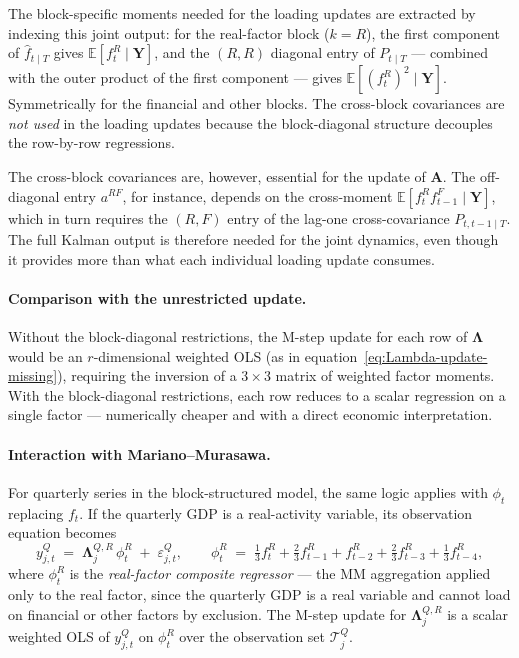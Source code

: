 \documentclass[11pt, a4paper, oneside]{article}
\newcommand{\mL}{\boldsymbol{\Lambda}}
\begin{document}
The block-specific moments needed for the loading updates are
extracted by indexing this joint output: for the real-factor block
($k = R$), the first component of $\hat{f}_{t \mid T}$ gives
$\mathbb{E}[f^R_t \mid \mathbf{Y}]$, and the $(R, R)$ diagonal entry
of $P_{t \mid T}$ — combined with the outer product of the first
component — gives $\mathbb{E}[(f^R_t)^2 \mid \mathbf{Y}]$. Symmetrically
for the financial and other blocks. The cross-block covariances are
\emph{not used} in the loading updates because the block-diagonal
structure decouples the row-by-row regressions.

The cross-block covariances are, however, essential for the update
of $\mathbf{A}$. The off-diagonal entry $a^{RF}$, for instance,
depends on the cross-moment $\mathbb{E}[f^R_t f^F_{t-1} \mid \mathbf{Y}]$,
which in turn requires the $(R, F)$ entry of the lag-one cross-covariance
$P_{t, t-1 \mid T}$. The full Kalman output is therefore needed for
the joint dynamics, even though it provides more than what each
individual loading update consumes.

\paragraph{Comparison with the unrestricted update.}
Without the block-diagonal restrictions, the M-step update for each
row of $\mL$ would be an $r$-dimensional weighted OLS
(as in equation~\eqref{eq:Lambda-update-missing}), requiring the
inversion of a $3 \times 3$ matrix of weighted factor moments. With
the block-diagonal restrictions, each row reduces to a scalar
regression on a single factor — numerically cheaper and with a
direct economic interpretation.

\paragraph{Interaction with Mariano–Murasawa.}
For quarterly series in the block-structured model, the same logic
applies with $\phi_t$ replacing $f_t$. If the quarterly GDP is a
real-activity variable, its observation equation becomes
\[
y^{Q}_{j, t} \;=\; \mL^{Q,R}_j\, \phi^R_t \;+\; \varepsilon^Q_{j, t},
\qquad \phi^R_t \;=\; \tfrac{1}{3} f^R_t + \tfrac{2}{3} f^R_{t-1} + f^R_{t-2} + \tfrac{2}{3} f^R_{t-3} + \tfrac{1}{3} f^R_{t-4},
\]
where $\phi^R_t$ is the \emph{real-factor composite regressor} — the
MM aggregation applied only to the real factor, since the quarterly
GDP is a real variable and cannot load on financial or other factors
by exclusion. The M-step update for $\mL^{Q,R}_j$ is a
scalar weighted OLS of $y^{Q}_{j, t}$ on $\phi^R_t$ over the
observation set $\mathcal{T}^Q_j$.
\end{document}
